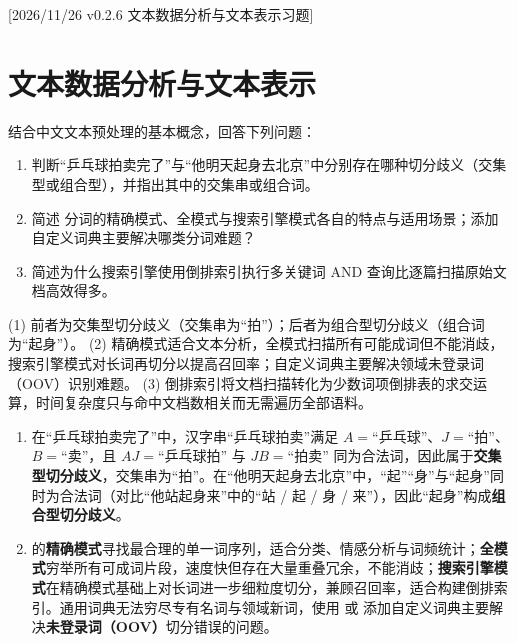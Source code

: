 %
%
[2026/11/26 v0.2.6 文本数据分析与文本表示习题]

\section{文本数据分析与文本表示}

\begin{exercise}[title={中文分词歧义辨析与倒排索引原理},level=basic,points=10,tags={中文分词,切分歧义,倒排索引}]\label{ex:ch07-seg-index}
结合中文文本预处理的基本概念，回答下列问题：
\begin{enumerate}
  \item 判断“乒乓球拍卖完了”与“他明天起身去北京”中分别存在哪种切分歧义（交集型或组合型），并指出其中的交集串或组合词。
  \item 简述  分词的精确模式、全模式与搜索引擎模式各自的特点与适用场景；添加自定义词典主要解决哪类分词难题？
  \item 简述为什么搜索引擎使用倒排索引执行多关键词 AND 查询比逐篇扫描原始文档高效得多。
\end{enumerate}
\begin{answer}
(1) 前者为交集型切分歧义（交集串为“拍”）；后者为组合型切分歧义（组合词为“起身”）。
(2) 精确模式适合文本分析，全模式扫描所有可能成词但不能消歧，搜索引擎模式对长词再切分以提高召回率；自定义词典主要解决领域未登录词（OOV）识别难题。
(3) 倒排索引将文档扫描转化为少数词项倒排表的求交运算，时间复杂度只与命中文档数相关而无需遍历全部语料。
\end{answer}
\begin{solution}
\begin{enumerate}
  \item 在“乒乓球拍卖完了”中，汉字串“乒乓球拍卖”满足 $A=\text{“乒乓球”}$、$J=\text{“拍”}$、$B=\text{“卖”}$，且 $AJ=\text{“乒乓球拍”}$ 与 $JB=\text{“拍卖”}$ 同为合法词，因此属于\textbf{交集型切分歧义}，交集串为“拍”。在“他明天起身去北京”中，“起”“身”与“起身”同时为合法词（对比“他站起身来”中的“站 / 起 / 身 / 来”），因此“起身”构成\textbf{组合型切分歧义}。
  \item {} 的\textbf{精确模式}寻找最合理的单一词序列，适合分类、情感分析与词频统计；\textbf{全模式}穷举所有可成词片段，速度快但存在大量重叠冗余，不能消歧；\textbf{搜索引擎模式}在精确模式基础上对长词进一步细粒度切分，兼顾召回率，适合构建倒排索引。通用词典无法穷尽专有名词与领域新词，使用  或  添加自定义词典主要解决\textbf{未登录词（OOV）}切分错误的问题。

\end{enumerate}
\end{solution}
\end{exercise}
